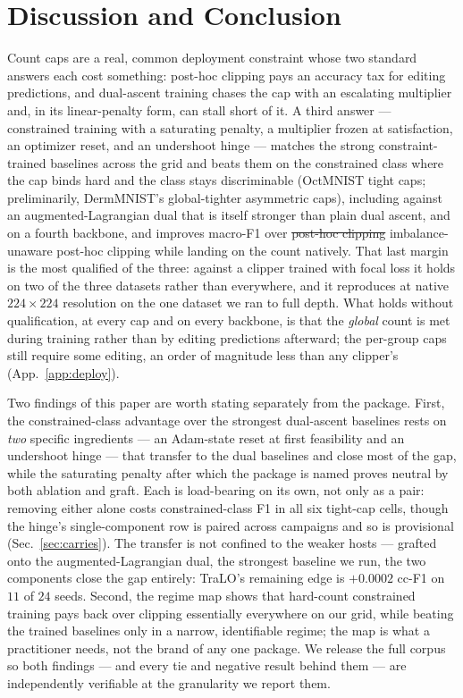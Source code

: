 \documentclass[10pt]{article}
\newcommand{\del}[1]{{\color{red}\sout{#1}}}
\begin{document}
\section{Discussion and Conclusion}
\label{sec:conclusion}

Count caps are a real, common deployment constraint whose two standard
answers each cost something: post-hoc clipping pays an accuracy tax for
editing predictions, and dual-ascent training chases the cap with an
escalating multiplier and, in its linear-penalty form, can stall short of
it. A third answer --- constrained training with a saturating penalty, a
multiplier frozen at satisfaction, an optimizer reset, and an undershoot
hinge --- matches the strong constraint-trained baselines across the grid
and beats them on the constrained class where the cap binds hard and the
class stays discriminable (OctMNIST tight caps; preliminarily,
DermMNIST's global-tighter asymmetric caps),{\color{blue} including against an
augmented-Lagrangian dual that is itself stronger than plain dual ascent, and on a
fourth backbone,} and improves macro-F1 over
\del{post-hoc clipping}{\color{blue} imbalance-unaware post-hoc clipping}
while landing on the count natively.{\color{blue} That last margin is the most
qualified of the three: against a clipper trained with focal loss it holds on two of the
three datasets rather than everywhere, and it reproduces at native
$224{\times}224$ resolution on the one dataset we ran to full depth. What holds
without qualification, at every cap and on every backbone, is that the
{\color{blue}\emph{global}} count is met
during training rather than by editing predictions afterward{\color{blue}; the
per-group caps still require some editing, an order of magnitude less than any
clipper's (App.~\ref{app:deploy})}.}

Two findings of this paper are worth stating separately from the
package. First, the constrained-class advantage over the strongest
dual-ascent baselines rests on \emph{two} specific ingredients --- an
Adam-state reset at first feasibility and an undershoot hinge --- that
transfer to the dual baselines and close most of the gap, while the
saturating penalty after which the package is named proves neutral by
both ablation and graft.{\color{blue} Each is load-bearing on its own, not only as
a pair: removing either alone costs constrained-class F1 in all six tight-cap
cells, though the hinge's single-component row is paired across campaigns and so
is provisional (Sec.~\ref{sec:carries}). The transfer is not confined to the
weaker hosts --- grafted onto the augmented-Lagrangian dual, the strongest
baseline we run, the two components close the gap entirely: TraLO's remaining
edge is $+0.0002$ cc-F1 on $11$ of $24$ seeds.} Second, the regime map shows that hard-count
constrained training pays back over clipping essentially everywhere on
our grid, while beating the trained baselines only in a narrow,
identifiable regime; the map is what a practitioner needs, not the
brand of any one package. We release the full corpus so both findings
--- and every tie and negative result behind them --- are independently
verifiable at the granularity we report them.
\end{document}
